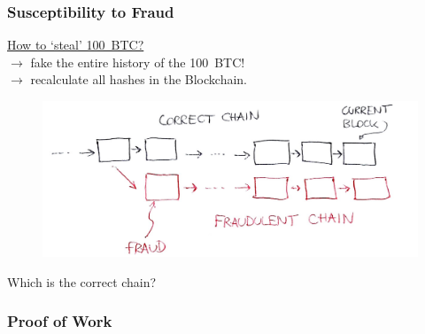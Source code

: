 \documentclass[12pt]{beamer}
\theoremstyle{definition}
\numberwithin{equation}{section}
\begin{document}
\begin{frame}
\frametitle{Susceptibility to Fraud}
\underline{How to `steal' 100~BTC?}\\ \pause $\to$ fake the entire history of the 100~BTC! \\$\to$ recalculate all hashes in the Blockchain.
\begin{figure}
\includegraphics[scale=0.28, trim = {30mm 0mm 0mm 20mm}]{fig3}
\end{figure}
\pause
Which is the correct chain?
\end{frame}

\begin{frame}
\frametitle{Proof of Work}
\end{frame}
\end{document}
